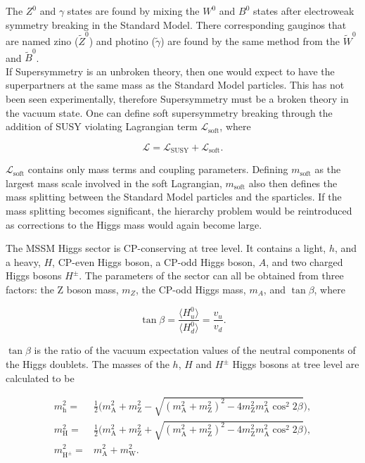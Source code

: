 The \(Z^{0}\) and \(\gamma\) states are found by mixing the \(W^0\) and \(B^0\) states after electroweak symmetry breaking in the Standard Model. There corresponding gauginos that are named zino (\(\tilde{Z}^0\)) and photino (\(\tilde{\gamma}\)) are found by the same method from the \(\tilde{W}^0\) and \(\tilde{B}^0\). \\

If Supersymmetry is an unbroken theory, then one would expect to have the superpartners at the same mass as the Standard Model particles. This has not been seen experimentally, therefore Supersymmetry must be a broken theory in the vacuum state. One can define soft supersymmetry breaking through the addition of SUSY violating Lagrangian term \(\mathcal{L}_{\text{soft}}\), where

\begin{equation}
    \mathcal{L} = \mathcal{L}_{\text{SUSY}} + \mathcal{L}_{\text{soft}}.
\end{equation}

\(\mathcal{L}_{\text{soft}}\) contains only mass terms and coupling parameters. Defining \(m_{\text{soft}}\) as the largest mass scale involved in the soft Lagrangian, \(m_{\text{soft}}\) also then defines the mass splitting between the Standard Model particles and the sparticles. If the mass splitting becomes significant, the hierarchy problem would be reintroduced as corrections to the Higgs mass would again become large.

The MSSM Higgs sector is CP-conserving at tree level. It contains a light, \(h\), and a heavy, \(H\), CP-even Higgs boson, a CP-odd Higgs boson, \(A\), and two charged Higgs bosons \(H^{\pm}\). The parameters of the sector can all be obtained from three factors: the Z boson mass, \(m_Z\), the CP-odd Higgs mass, \(m_A\), and \(\tan\beta\), where

\begin{equation}
    \tan \beta = \frac{\langle H_{u}^{0} \rangle}{\langle H_{d}^{0} \rangle} = \frac{v_u}{v_d}.
\end{equation}

\(\tan \beta\) is the ratio of the vacuum expectation values of the neutral components of the Higgs doublets. The masses of the \(h\), \(H\) and \(H^{\pm}\) Higgs bosons at tree level are calculated to be \cite{mssm_theory}

\begin{subequations}
\begin{align}
    m_{\text{h}}^2 = & \frac{1}{2}\Big(m_{\text{A}}^2 + m_{\text{Z}}^2 - \sqrt{(m_{\text{A}}^2 + m_{\text{Z}}^2)^2 - 4 m_{\text{Z}}^2 m_{\text{A}}^2 \cos^2{2\beta}} \Big), \\
    m_{\text{H}}^2 = & \frac{1}{2}\Big(m_{\text{A}}^2 + m_{\text{Z}}^2 + \sqrt{(m_{\text{A}}^2 + m_{\text{Z}}^2)^2 - 4 m_{\text{Z}}^2 m_{\text{A}}^2 \cos^2{2\beta}} \Big), \\
    m_{\text{H}^{\pm}}^2 = & m_{\text{A}}^2 + m_{\text{W}}^2.
\end{align}
\end{subequations}

